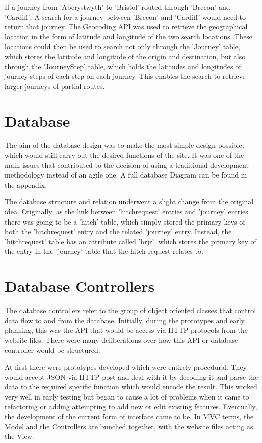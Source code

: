 	If a journey from 'Aberystwyth' to 'Bristol' routed through 'Brecon' and 'Cardiff', A search for a journey between 'Brecon' and 'Cardiff' would need to return that journey. The Geocoding API was used to retrieve the geographical location in the form of latitude and longitude of the two search locations. These locations could then be used to search not only through the 'Journey' table, which stores the latitude and longitude of the origin and destination, but also through the 'Journey\textunderscore Step' table, which holds the latitudes and longitudes of journey steps of each step on each journey. This enables the search to retrieve larger journeys of partial routes.
	
\section{Database}	

The aim of the database design was to make the most simple design possible, which would still carry out the desired functions of the site. It was one of the main issues that contributed to the decision of using a traditional development methodology instead of an agile one. A full database Diagram can be found in the appendix.

The database structure and relation underwent a slight change from the original idea. Originally, as the link between 'hitch\textunderscore request' entries and 'journey' entries there was going to be a 'hitch' table, which simply stored the primary keys of both the 'hitch\textunderscore request' entry and the related 'journey' entry. Instead, the 'hitch\textunderscore request' table has an attribute called 'hr\textunderscore jr', which stores the primary key of the entry in the 'journey' table that the hitch request relates to.
	
\section{Database Controllers}
	The database controllers refer to the group of object oriented classes that control data flow to and from the database. Initially, during the prototypes and early planning, this was the API that would be access via HTTP protocols from the website files. There were many deliberations over how this API or database controller would be structured.
	
	At first there were prototypes developed which were entirely procedural. They would accept JSON via HTTP post and deal with it by decoding it and parse the data to the required specific function which would encode the result. This worked very well in early testing but began to cause a lot of problems when it came to refactoring or adding attempting to add new or edit existing features. Eventually, the development of the current form of interface came to be. In MVC terms, the Model and the Controllers are bunched together, with the website files acting as the View.

